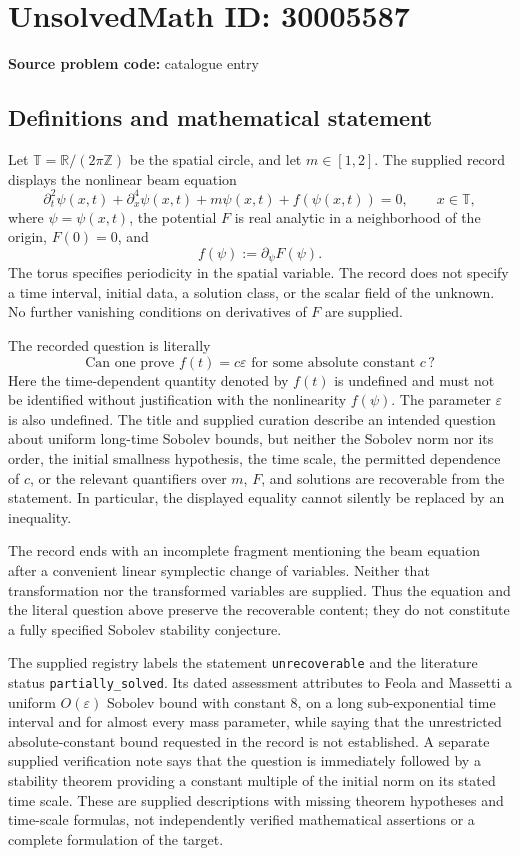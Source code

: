 \documentclass[11pt]{article}
\newcommand{\Z}{\mathbb{Z}}
\newcommand{\R}{\mathbb{R}}
\begin{document}
\section*{UnsolvedMath ID: 30005587}
\textbf{Source problem code:} catalogue entry
\subsection{Definitions and mathematical statement}
Let \(\mathbb T=\R/(2\pi\Z)\) be the spatial circle, and let \(m\in[1,2]\). The supplied record displays the nonlinear beam equation
\[
\partial_t^2\psi(x,t)+\partial_x^4\psi(x,t)+m\psi(x,t)+f(\psi(x,t))=0,
\qquad x\in\mathbb T,
\]
where \(\psi=\psi(x,t)\), the potential \(F\) is real analytic in a neighborhood of the origin, \(F(0)=0\), and
\[
f(\psi):=\partial_\psi F(\psi).
\]
The torus specifies periodicity in the spatial variable. The record does not specify a time interval, initial data, a solution class, or the scalar field of the unknown. No further vanishing conditions on derivatives of \(F\) are supplied.

The recorded question is literally
\[
\text{Can one prove } f(t)=c\varepsilon
\text{ for some absolute constant }c\,?
\]
Here the time-dependent quantity denoted by \(f(t)\) is undefined and must not be identified without justification with the nonlinearity \(f(\psi)\). The parameter \(\varepsilon\) is also undefined. The title and supplied curation describe an intended question about uniform long-time Sobolev bounds, but neither the Sobolev norm nor its order, the initial smallness hypothesis, the time scale, the permitted dependence of \(c\), or the relevant quantifiers over \(m\), \(F\), and solutions are recoverable from the statement. In particular, the displayed equality cannot silently be replaced by an inequality.

The record ends with an incomplete fragment mentioning the beam equation after a convenient linear symplectic change of variables. Neither that transformation nor the transformed variables are supplied. Thus the equation and the literal question above preserve the recoverable content; they do not constitute a fully specified Sobolev stability conjecture.

The supplied registry labels the statement \texttt{unrecoverable} and the literature status \texttt{partially\_solved}. Its dated assessment attributes to Feola and Massetti a uniform \(O(\varepsilon)\) Sobolev bound with constant \(8\), on a long sub-exponential time interval and for almost every mass parameter, while saying that the unrestricted absolute-constant bound requested in the record is not established. A separate supplied verification note says that the question is immediately followed by a stability theorem providing a constant multiple of the initial norm on its stated time scale. These are supplied descriptions with missing theorem hypotheses and time-scale formulas, not independently verified mathematical assertions or a complete formulation of the target.
\end{document}

